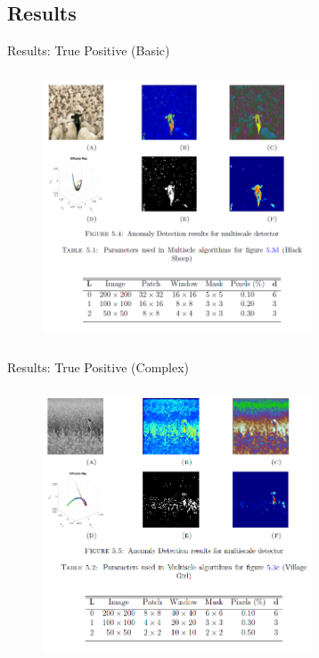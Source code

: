 \documentclass{beamer}
\theoremstyle{plain}
\theoremstyle{definition}
\theoremstyle{plain}
\theoremstyle{plain}
\begin{document}
\subsection{Results}
\begin{frame}{Results: True Positive (Basic)}

\begin{figure}[ht]
\begin{center}
\includegraphics[width=8cm, height =8cm]{./figures/R_1.png}
\label{algo}
\end{center}
\end{figure}

\end{frame}
\begin{frame}{Results: True Positive (Complex)}

\begin{figure}[ht]
\begin{center}
\includegraphics[width=8cm, height =8cm]{./figures/R_2.png}
\label{algo}
\end{center}
\end{figure}

\end{frame}
\end{document}
